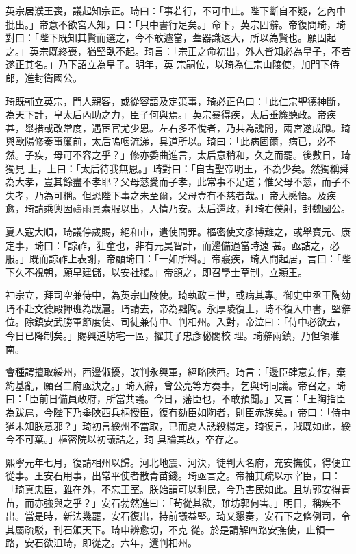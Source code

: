 \begin{pinyinscope}
 英宗居濮王喪，議起知宗正。琦曰：「事若行，不可中止。陛下斷自不疑，乞內中批出。」帝意不欲宮人知，曰：「只中書行足矣。」命下，英宗固辭。帝復問琦，琦對曰：「陛下既知其賢而選之，今不敢遽當，蓋器識遠大，所以為賢也。願固起之。」英宗既終喪，猶堅臥不起。琦言：「宗正之命初出，外人皆知必為皇子，不若遂正其名。」乃下詔立為皇子。明年，英
 宗嗣位，以琦為仁宗山陵使，加門下侍郎，進封衛國公。



 琦既輔立英宗，門人親客，或從容語及定策事，琦必正色曰：「此仁宗聖德神斷，為天下計，皇太后內助之力，臣子何與焉。」英宗暴得疾，太后垂簾聽政。帝疾甚，舉措或改常度，遇宦官尤少恩。左右多不悅者，乃共為讒間，兩宮遂成隙。琦與歐陽修奏事簾前，太后嗚咽流涕，具道所以。琦曰：「此病固爾，病已，必不然。子疾，母可不容之乎？」修亦委曲進言，太后意稍和，久之而罷。後數日，琦獨見
 上，上曰：「太后待我無恩。」琦對曰：「自古聖帝明王，不為少矣。然獨稱舜為大孝，豈其餘盡不孝耶？父母慈愛而子孝，此常事不足道；惟父母不慈，而子不失孝，乃為可稱。但恐陛下事之未至爾，父母豈有不慈者哉。」帝大感悟。及疾愈，琦請乘輿因禱雨具素服以出，人情乃安。太后還政，拜琦右僕射，封魏國公。



 夏人寇大順，琦議停歲賜，絕和市，遣使問罪。樞密使文彥博難之，或舉寶元、康定事，琦曰：「諒祚，狂童也，非有元昊智計，而邊備過當時遠
 甚。亟詰之，必服。」既而諒祚上表謝，帝顧琦曰：「一如所料。」帝寢疾，琦入問起居，言曰：「陛下久不視朝，願早建儲，以安社稷。」帝頷之，即召學士草制，立穎王。



 神宗立，拜司空兼侍中，為英宗山陵使。琦執政三世，或病其專。御史中丞王陶劾琦不赴文德殿押班為跋扈。琦請去，帝為黜陶。永厚陵復土，琦不復入中書，堅辭位。除鎮安武勝軍節度使、司徒兼侍中、判相州。入對，帝泣曰：「侍中必欲去，今日已降制矣。」賜興道坊宅一區，擢其子忠彥秘閣校
 理。琦辭兩鎮，乃但領淮南。



 會種諤擅取綏州，西邊俶擾，改判永興軍，經略陜西。琦言：「邊臣肆意妄作，棄約基亂，願召二府亟決之。」琦入辭，曾公亮等方奏事，乞與琦同議。帝召之，琦曰：「臣前日備員政府，所當共議。今日，藩臣也，不敢預聞。」又言：「王陶指臣為跋扈，今陛下乃舉陜西兵柄授臣，復有劾臣如陶者，則臣赤族矣。」帝曰：「侍中猶未知朕意邪？」琦初言綏州不當取，已而夏人誘殺楊定，琦復言，賊既如此，綏今不可棄。」樞密院以初議詰之，琦
 具論其故，卒存之。



 熙寧元年七月，復請相州以歸。河北地震、河決，徒判大名府，充安撫使，得便宜從事。王安石用事，出常平使者散青苗錢。琦亟言之。帝袖其疏以示宰臣，曰：「琦真忠臣，雖在外，不忘王室。朕始謂可以利民，今乃害民如此。且坊郭安得青苗，而亦強與之乎？」安石勃然進曰：「茍從其欲，雖坊郭何害。」明日，稱疾不出。當是時，新法幾罷，安石復出，持前議益堅。琦又懇奏，安石下之條例司，令其屬疏駁，刊石頒天下。琦申辨愈切，不克
 從。於是請解四路安撫使，止領一路，安石欲沮琦，即從之。六年，還判相州。




\end{pinyinscope}
